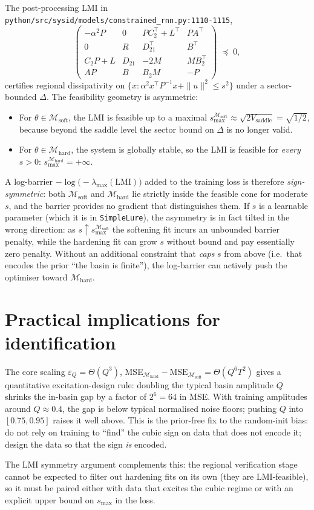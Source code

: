\documentclass[11pt]{article}
\newcommand{\Mhard}{\mathcal{M}_{\mathrm{hard}}}
\newcommand{\Msoft}{\mathcal{M}_{\mathrm{soft}}}
\begin{document}
The post-processing LMI in
\texttt{python/src/sysid/models/constrained\_rnn.py:1110-1115},
\[
\begin{pmatrix}
-\alpha^2 P & 0 & P C_2^\top + L^\top & P A^\top \\
0 & R & D_{21}^\top & B^\top \\
C_2 P + L & D_{21} & -2 M & M B_2^\top \\
A P & B & B_2 M & -P
\end{pmatrix}
\;\preceq\; 0,
\]
certifies regional dissipativity on
\(\{x : \alpha^2 x^\top P^{-1} x + \|u\|^2 \le s^2\}\) under a
sector-bounded \(\Delta\). The feasibility geometry is asymmetric:
\begin{itemize}
\item For \(\theta \in \Msoft\), the LMI is feasible up to a maximal
      \(s_{\max}^{\Msoft} \approx \sqrt{2 V_{\text{saddle}}} = \sqrt{1/2}\),
      because beyond the saddle level the sector bound on \(\Delta\)
      is no longer valid.
\item For \(\theta \in \Mhard\), the system is globally stable, so
      the LMI is feasible for \emph{every} \(s > 0\): \(s_{\max}^{\Mhard} = +\infty\).
\end{itemize}
A log-barrier \(-\log\bigl(-\lambda_{\max}(\text{LMI})\bigr)\) added
to the training loss is therefore \emph{sign-symmetric}: both
\(\Msoft\) and \(\Mhard\) lie strictly inside the feasible cone for
moderate \(s\), and the barrier provides no gradient that
distinguishes them. If \(s\) is a learnable parameter (which it is
in \texttt{SimpleLure}), the asymmetry is in fact tilted in the wrong
direction: as \(s \uparrow s_{\max}^{\Msoft}\) the softening fit
incurs an unbounded barrier penalty, while the hardening fit can
grow \(s\) without bound and pay essentially zero penalty. Without
an additional constraint that \emph{caps} \(s\) from above (i.e.\
that encodes the prior ``the basin is finite''), the log-barrier can
actively push the optimiser toward \(\Mhard\).

\section{Practical implications for identification}

The core scaling \(\varepsilon_Q = \Theta(Q^3)\),
MSE\(_{\Mhard} - \text{MSE}_{\Msoft} = \Theta(Q^6 T^2)\) gives a
quantitative excitation-design rule: doubling the typical basin
amplitude \(Q\) shrinks the in-basin gap by a factor of
\(2^6 = 64\) in MSE. With training amplitudes around \(Q \approx
0.4\), the gap is below typical normalised noise floors; pushing
\(Q\) into \([0.75, 0.95]\) raises it well above. This is the
prior-free fix to the random-init bias: do not rely on training to
``find'' the cubic sign on data that does not encode it; design the
data so that the sign \emph{is} encoded.

The LMI symmetry argument complements this: the regional
verification stage cannot be expected to filter out hardening fits
on its own (they are LMI-feasible), so it must be paired either
with data that excites the cubic regime or with an explicit
upper bound on \(s_{\max}\) in the loss.
\end{document}
